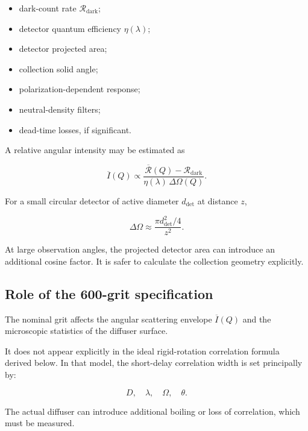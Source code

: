 \documentclass[11pt]{article}
\begin{document}
\begin{itemize}
    \item dark-count rate $\mathcal{R}_{\mathrm{dark}}$;
    \item detector quantum efficiency $\eta(\lambda)$;
    \item detector projected area;
    \item collection solid angle;
    \item polarization-dependent response;
    \item neutral-density filters;
    \item dead-time losses, if significant.
\end{itemize}

A relative angular intensity may be estimated as

\begin{equation}
    \overline{I}(Q)
    \propto
    \frac{
        \overline{\mathcal{R}}(Q)
        -
        \mathcal{R}_{\mathrm{dark}}
    }{
        \eta(\lambda)\,\Delta\Omega(Q)
    }.
\end{equation}

For a small circular detector of active diameter $d_{\mathrm{det}}$ at distance
$z$,

\begin{equation}
    \Delta\Omega
    \approx
    \frac{
        \pi d_{\mathrm{det}}^2/4
    }{z^2}.
\end{equation}

At large observation angles, the projected detector area can introduce an
additional cosine factor. It is safer to calculate the collection geometry
explicitly.

\subsection{Role of the 600-grit specification}

The nominal grit affects the angular scattering envelope
$\overline{I}(Q)$ and the microscopic statistics of the diffuser surface.

It does not appear explicitly in the ideal rigid-rotation correlation formula
derived below. In that model, the short-delay correlation width is set
principally by:

\begin{equation}
    D,\quad \lambda,\quad \Omega,\quad \theta.
\end{equation}

The actual diffuser can introduce additional boiling or loss of correlation,
which must be measured.
\end{document}

